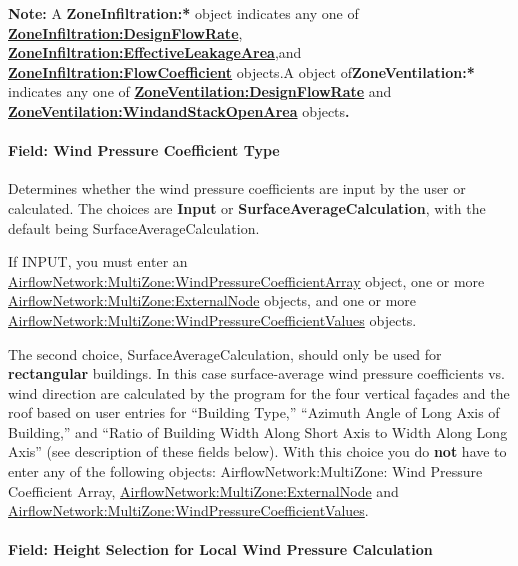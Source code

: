 \textbf{Note:} A \textbf{ZoneInfiltration:*} object indicates any one of \textbf{\hyperref[zoneinfiltrationdesignflowrate]{ZoneInfiltration:DesignFlowRate}}, \textbf{\hyperref[zoneinfiltrationeffectiveleakagearea]{ZoneInfiltration:EffectiveLeakageArea}},and \textbf{\hyperref[zoneinfiltrationflowcoefficient]{ZoneInfiltration:FlowCoefficient}} objects.A object of\textbf{ZoneVentilation:*} indicates any one of \textbf{\hyperref[zoneventilationdesignflowrate]{ZoneVentilation:DesignFlowRate}} and \textbf{\hyperref[zoneventilationwindandstackopenarea]{ZoneVentilation:WindandStackOpenArea}} objects\textbf{.}

\paragraph{Field: Wind Pressure Coefficient Type}\label{field-wind-pressure-coefficient-type}

Determines whether the wind pressure coefficients are input by the user or calculated. The choices are \textbf{Input} or \textbf{SurfaceAverageCalculation}, with the default being SurfaceAverageCalculation.

If INPUT, you must enter an \hyperref[airflownetworkmultizonewindpressurecoefficientarray]{AirflowNetwork:MultiZone:WindPressureCoefficientArray} object, one or more \hyperref[airflownetworkmultizoneexternalnode]{AirflowNetwork:MultiZone:ExternalNode} objects, and one or more \hyperref[airflownetworkmultizonewindpressurecoefficientvalues]{AirflowNetwork:MultiZone:WindPressureCoefficientValues} objects.

The second choice, SurfaceAverageCalculation, should only be used for \textbf{rectangular} buildings. In this case surface-average wind pressure coefficients vs. wind direction are calculated by the program for the four vertical fa\c{c}ades and the roof based on user entries for ``Building Type,'' ``Azimuth Angle of Long Axis of Building,'' and ``Ratio of Building Width Along Short Axis to Width Along Long Axis'' (see description of these fields below). With this choice you do \textbf{not} have to enter any of the following objects: AirflowNetwork:MultiZone: Wind Pressure Coefficient Array, \hyperref[airflownetworkmultizoneexternalnode]{AirflowNetwork:MultiZone:ExternalNode} and \hyperref[airflownetworkmultizonewindpressurecoefficientvalues]{AirflowNetwork:MultiZone:WindPressureCoefficientValues}.

\paragraph{Field: Height Selection for Local Wind Pressure Calculation}\label{field-height-selection-for-local-wind-pressure-calculation}

